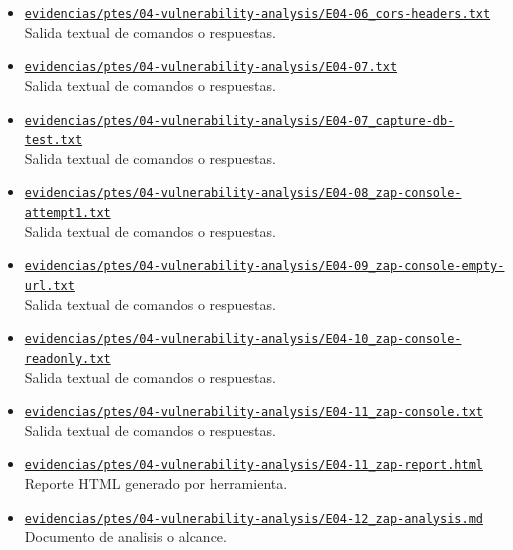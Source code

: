 \begin{itemize}[leftmargin=1.2em]
  {\small Salida textual de comandos o respuestas.}
  \item \href{https://github.com/gamurigm/inventrack-ptes-report/blob/main/evidencias/ptes/04-vulnerability-analysis/E04-06_cors-headers.txt}{\nolinkurl{evidencias/ptes/04-vulnerability-analysis/E04-06_cors-headers.txt}}\\
  {\small Salida textual de comandos o respuestas.}
  \item \href{https://github.com/gamurigm/inventrack-ptes-report/blob/main/evidencias/ptes/04-vulnerability-analysis/E04-07.txt}{\nolinkurl{evidencias/ptes/04-vulnerability-analysis/E04-07.txt}}\\
  {\small Salida textual de comandos o respuestas.}
  \item \href{https://github.com/gamurigm/inventrack-ptes-report/blob/main/evidencias/ptes/04-vulnerability-analysis/E04-07_capture-db-test.txt}{\nolinkurl{evidencias/ptes/04-vulnerability-analysis/E04-07_capture-db-test.txt}}\\
  {\small Salida textual de comandos o respuestas.}
  \item \href{https://github.com/gamurigm/inventrack-ptes-report/blob/main/evidencias/ptes/04-vulnerability-analysis/E04-08_zap-console-attempt1.txt}{\nolinkurl{evidencias/ptes/04-vulnerability-analysis/E04-08_zap-console-attempt1.txt}}\\
  {\small Salida textual de comandos o respuestas.}
  \item \href{https://github.com/gamurigm/inventrack-ptes-report/blob/main/evidencias/ptes/04-vulnerability-analysis/E04-09_zap-console-empty-url.txt}{\nolinkurl{evidencias/ptes/04-vulnerability-analysis/E04-09_zap-console-empty-url.txt}}\\
  {\small Salida textual de comandos o respuestas.}
  \item \href{https://github.com/gamurigm/inventrack-ptes-report/blob/main/evidencias/ptes/04-vulnerability-analysis/E04-10_zap-console-readonly.txt}{\nolinkurl{evidencias/ptes/04-vulnerability-analysis/E04-10_zap-console-readonly.txt}}\\
  {\small Salida textual de comandos o respuestas.}
  \item \href{https://github.com/gamurigm/inventrack-ptes-report/blob/main/evidencias/ptes/04-vulnerability-analysis/E04-11_zap-console.txt}{\nolinkurl{evidencias/ptes/04-vulnerability-analysis/E04-11_zap-console.txt}}\\
  {\small Salida textual de comandos o respuestas.}
  \item \href{https://github.com/gamurigm/inventrack-ptes-report/blob/main/evidencias/ptes/04-vulnerability-analysis/E04-11_zap-report.html}{\nolinkurl{evidencias/ptes/04-vulnerability-analysis/E04-11_zap-report.html}}\\
  {\small Reporte HTML generado por herramienta.}
  \item \href{https://github.com/gamurigm/inventrack-ptes-report/blob/main/evidencias/ptes/04-vulnerability-analysis/E04-12_zap-analysis.md}{\nolinkurl{evidencias/ptes/04-vulnerability-analysis/E04-12_zap-analysis.md}}\\
  {\small Documento de analisis o alcance.}
\end{itemize}

